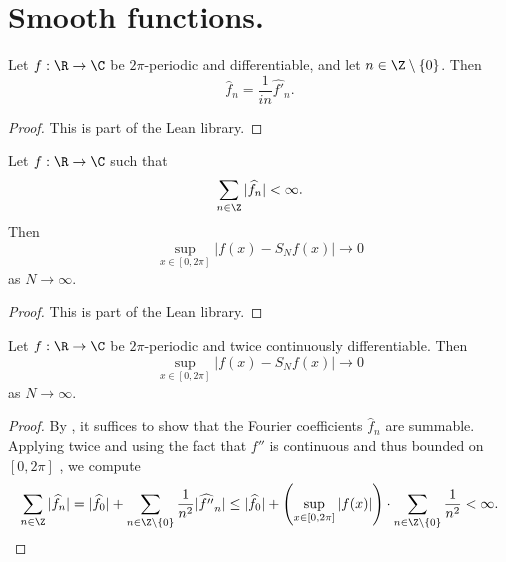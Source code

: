 \section{Smooth functions.}
\label{10smooth}
\begin{lemma}
\label{fourier-coeff-derivative}
\leanok
Let $f:\R \to \C$ be $2\pi$-periodic and differentiable, and let $n \in \Z \setminus \{0\}$. Then
\begin{equation}
    \widehat{f}_n = \frac{1}{i n} \widehat{f'}_n.
\end{equation}
\end{lemma}
\begin{proof}
\leanok
This is part of the Lean library.
\end{proof}

\begin{lemma}
\label{convergence-of-coeffs-summable}
\leanok
{}
Let $f:\R \to \C$ such that
\begin{equation}
    \sum_{n\in \Z} |\widehat{f}_n| < \infty.
\end{equation}
Then
\begin{equation}
    \sup_{x\in [0,2\pi]} |f(x) - S_Nf(x)| \rightarrow 0
\end{equation}
as $N \rightarrow \infty$.
\end{lemma}

\begin{proof}
\leanok
    This is part of the Lean library.
\end{proof}

\begin{lemma}
\label{convergence-for-twice-contdiff}
\leanok
{}
    Let $f:\R \to \C$ be $2\pi$-periodic and twice continuously differentiable. Then
    \begin{equation}
        \sup_{x\in [0,2\pi]} |f(x) - S_Nf(x)| \rightarrow 0
    \end{equation}
    as $N \rightarrow \infty$.
\end{lemma}
\begin{proof}
\leanok
By , it suffices to show that the Fourier coefficients $\widehat{f}_n$ are summable.
Applying  twice and using the fact that $f''$ is continuous and thus bounded on $[0,2\pi]$ , we compute
\begin{equation*}
    \sum_{n\in \Z} |\widehat{f}_n| = |\widehat{f}_0| + \sum_{n\in \Z \setminus \{0\}} \frac {1}{n^2} |\widehat{f''}_n|
    \le |\widehat{f}_0| + \left(\sup_{x\in [0,2\pi]} |f(x)| \right) \cdot \sum_{n\in \Z \setminus \{0\}} \frac {1}{n^2}
    < \infty.
\end{equation*}
\end{proof}

